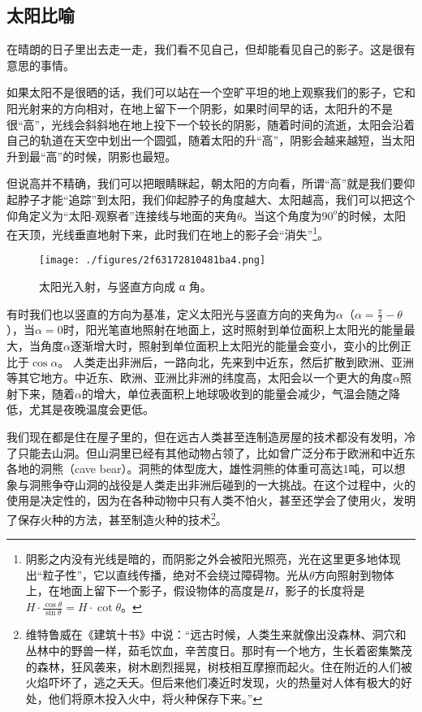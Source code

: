 

\subsection{太阳比喻}

在晴朗的日子里出去走一走，我们看不见自己，但却能看见自己的影子。这是很有意思的事情。

如果太阳不是很晒的话，我们可以站在一个空旷平坦的地上观察我们的影子，它和阳光射来的方向相对，在地上留下一个阴影，如果时间早的话，太阳升的不是很“高”，光线会斜斜地在地上投下一个较长的阴影，随着时间的流逝，太阳会沿着自己的轨道在天空中划出一个圆弧，随着太阳的升“高”，阴影会越来越短，当太阳升到最“高”的时候，阴影也最短。

但说高并不精确，我们可以把眼睛眯起，朝太阳的方向看，所谓“高”就是我们要仰起脖子才能“追踪”到太阳，我们仰起脖子的角度越大、太阳越高，我们可以把这个仰角定义为“太阳-观察者”连接线与地面的夹角$\theta$。当这个角度为$90^o$的时候，太阳在天顶，光线垂直地射下来，此时我们在地上的影子会“消失”\footnote{阴影之内没有光线是暗的，而阴影之外会被阳光照亮，光在这里更多地体现出“粒子性”，它以直线传播，绝对不会绕过障碍物。光从$\theta$方向照射到物体上，在地面上留下一个影子，假设物体的高度是$H$，影子的长度将是$H \cdot \frac{\cos \theta}{\sin \theta } = H \cdot \cot \theta$。}。

\begin{figure}[ht]
\centering
\texttt{[image: ./figures/2f63172810481ba4.png]}
\caption{太阳光⼊射，与竖直⽅向成 α 角。} \label{fig_QMPre3_4}
\end{figure}

有时我们也以竖直的方向为基准，定义太阳光与竖直方向的夹角为$\alpha$（$\alpha = \frac{\pi}{2} - \theta $），当$\alpha = 0$时，阳光笔直地照射在地面上，这时照射到单位面积上太阳光的能量最大，当角度$\alpha$逐渐增大时，照射到单位面积上太阳光的能量会变小，变小的比例正比于$\cos \alpha$。
人类走出非洲后，一路向北，先来到中近东，然后扩散到欧洲、亚洲等其它地方。中近东、欧洲、亚洲比非洲的纬度高，太阳会以一个更大的角度$\alpha$照射下来，随着$\alpha$的增大，单位表面积上地球吸收到的能量会减少，气温会随之降低，尤其是夜晚温度会更低。

我们现在都是住在屋子里的，但在远古人类甚至连制造房屋的技术都没有发明，冷了只能去山洞。但山洞里已经有其他动物占领了，比如曾广泛分布于欧洲和中近东各地的洞熊（cave bear）。洞熊的体型庞大，雄性洞熊的体重可高达1吨，可以想象与洞熊争夺山洞的战役是人类走出非洲后碰到的一大挑战。在这个过程中，火的使用是决定性的，因为在各种动物中只有人类不怕火，甚至还学会了使用火，发明了保存火种的方法，甚至制造火种的技术\footnote{维特鲁威在《建筑十书》中说：“远古时候，人类生来就像出没森林、洞穴和丛林中的野兽一样，茹毛饮血，辛苦度日。那时有一个地方，生长着密集繁茂的森林，狂风袭来，树木剧烈摇晃，树枝相互摩擦而起火。住在附近的人们被火焰吓坏了，逃之夭夭。但后来他们凑近时发现，火的热量对人体有极大的好处，他们将原木投入火中，将火种保存下来。”}。

